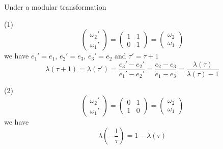 \documentclass[12pt, oneside]{book}
\begin{document}
\begin{theorem}
    Under a modular transformation

    (1)
    \begin{equation*}
        \left(
        \begin{matrix}
            \omega_2' \\
            \omega_1'
        \end{matrix}
        \right)
        =
        \left(
        \begin{matrix}
            1 & 1 \\
            0 & 1
        \end{matrix}
        \right)
        =
        \left(
        \begin{matrix}
            \omega_2 \\
            \omega_1
        \end{matrix}
        \right)
    \end{equation*}
    we have $e_1'=e_1$, $e_2'=e_3$, $e_3'=e_2$ and $\tau' =\tau +1$
    \begin{equation*}
        \lambda\left(\tau+1\right)
        =
        \lambda\left(\tau'\right)
        =
        \frac{e_3'-e_2'}{e_1'-e_2'}
        =
        \frac{e_2-e_3}{e_1-e_3}
        =
        \frac{\lambda\left(\tau\right)}{ \lambda\left(\tau\right) -1}
    \end{equation*}

    (2)
    \begin{equation*}
        \left(
        \begin{matrix}
            \omega_2' \\
            \omega_1'
        \end{matrix}
        \right)
        =
        \left(
        \begin{matrix}
            0 & 1 \\
            1 & 0
        \end{matrix}
        \right)
        =
        \left(
        \begin{matrix}
            \omega_2 \\
            \omega_1
        \end{matrix}
        \right)
    \end{equation*}
    we have
    \begin{equation*}
        \lambda\left(-\frac{1}{\tau}\right)
        =
        1 - \lambda\left(\tau\right)
    \end{equation*}
\end{theorem}
\end{document}
